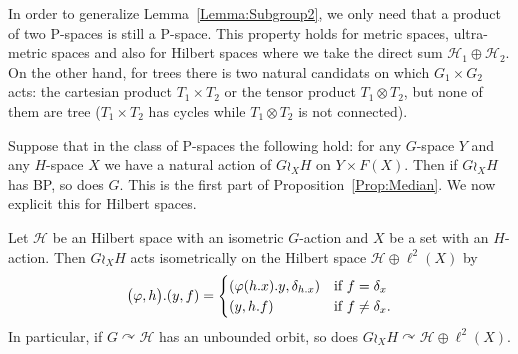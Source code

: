 In order to generalize Lemma~\ref{Lemma:Subgroup2}, we only need that a product of two P-spaces is still a P-space.
This property holds for metric spaces, ultra-metric spaces and also for Hilbert spaces where we take the direct sum $\mathcal H_1\oplus\mathcal H_2$.
On the other hand, for trees there is two natural candidats on which $G_1\times G_2$ acts: the cartesian product $T_1\times T_2$ or the tensor product $T_1\otimes T_2$, but none of them are tree ($T_1\times T_2$ has cycles while $T_1\otimes T_2$ is not connected).

Suppose that in the class of P-spaces the following hold: for any $G$-space $Y$ and any $H$-space $X$ we have a natural action of $G\wr_XH$ on $Y\times F(X)$. Then if $G\wr_X H$ has BP, so does $G$. This is the first part of Proposition~\ref{Prop:Median}.
We now explicit this for Hilbert spaces.
\begin{lem}
Let $\mathcal H$ be an Hilbert space with an isometric $G$-action and $X$ be a set with an $H$-action.
Then $G\wr_XH$ acts isometrically on the Hilbert space $\mathcal H\oplus \ell^2(X)$ by
\[
	\bigl(\phi,h\bigr).(y,f)=
	\begin{cases}
	(\phi(h.x).y,\delta_{h.x})&\textnormal{if $f=\delta_x$}\\
	(y,h.f)&\textnormal{if $f\neq\delta_x$.}
	\end{cases}
\]
In particular, if $G\curvearrowright \mathcal H$ has an unbounded orbit, so does $G\wr_XH\curvearrowright\mathcal H\oplus \ell^2(X)$.
\end{lem}

